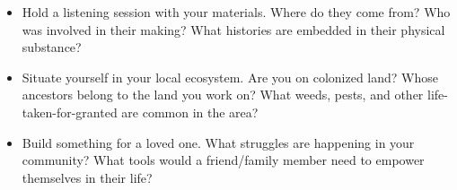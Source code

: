 \begin{itemize}
  \item Hold a listening session with your materials. Where do they come from? Who was involved in their making? What histories are embedded in their physical substance?
  \item Situate yourself in your local ecosystem. Are you on colonized land? Whose ancestors belong to the land you work on? What weeds, pests, and other life-taken-for-granted are common in the area?
  \item Build something for a loved one. What struggles are happening in your community? What tools would a friend/family member need to empower themselves in their life?
\end{itemize}